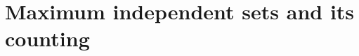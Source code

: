 \documentclass[onefignum, onetabnum]{siamart190516}
\newcommand{\<}{\langle}
\renewcommand{\>}{\rangle}
\begin{document}



\section{Maximum independent sets and its counting}
\end{document}
